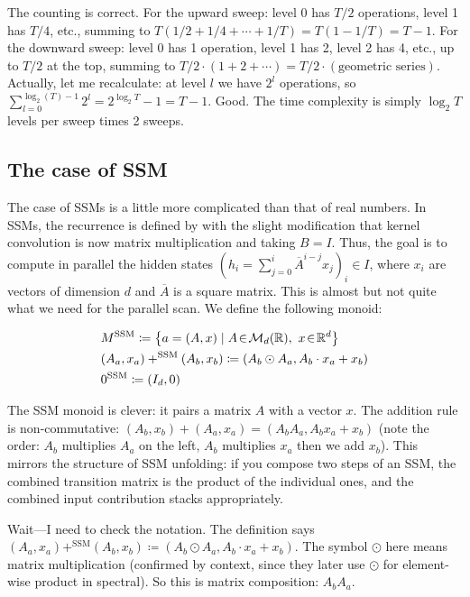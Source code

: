\begin{ThomasAnnotation}
The counting is correct. For the upward sweep: level 0 has $T/2$ operations, level 1 has $T/4$, etc., summing to $T(1/2 + 1/4 + \cdots + 1/T) = T(1 - 1/T) = T-1$. For the downward sweep: level 0 has 1 operation, level 1 has 2, level 2 has 4, etc., up to $T/2$ at the top, summing to $T/2 \cdot (1 + 2 + \cdots) = T/2 \cdot (\text{geometric series})$. Actually, let me recalculate: at level $l$ we have $2^l$ operations, so $\sum_{l=0}^{\log_2(T)-1} 2^l = 2^{\log_2 T} - 1 = T - 1$. Good. The time complexity is simply $\log_2 T$ levels per sweep times 2 sweeps.
\end{ThomasAnnotation}

\subsection{The case of SSM}
\label{sec:scan_SSM}

The case of SSMs is a little more complicated than that of real numbers. In SSMs, the recurrence is defined by  with the slight modification that kernel convolution is now matrix multiplication and taking $B = I$. Thus, the goal is to compute in parallel the hidden states $(h_i = \sum_{j=0}^i\overline{A}^{i-j}x_j)_i\in I$, where $x_i$ are vectors of dimension $d$ and $\overline{A}$ is a square matrix. This is almost but not quite what we need for the parallel scan. We define the following monoid:

\begin{align}
\label{eq:M_SSM}
    &M^{\mathrm{SSM}}\coloneqq \left\{a = (A, x)\mid A\!\in\!\mathcal{M}_{d}(\mathbb{R}),~x\!\in\!\mathbb{R}^d\right\}\\
\label{eq:+_SSM}
    &(A_a, x_a) +^{\mathrm{SSM}} (A_b,x_b)\coloneqq (A_b \odot A_a, A_b \cdot x_a + x_b)\\
\label{eq:0_SSM}
    &0^{\mathrm{SSM}}\coloneqq(I_d, 0)
\end{align}

\begin{ThomasAnnotation}
The SSM monoid is clever: it pairs a matrix $A$ with a vector $x$. The addition rule is non-commutative: $(A_b, x_b) + (A_a, x_a) = (A_b A_a, A_b x_a + x_b)$ (note the order: $A_b$ multiplies $A_a$ on the left, $A_b$ multiplies $x_a$ then we add $x_b$). This mirrors the structure of SSM unfolding: if you compose two steps of an SSM, the combined transition matrix is the product of the individual ones, and the combined input contribution stacks appropriately.

Wait—I need to check the notation. The definition says $(A_a, x_a) +^{\mathrm{SSM}} (A_b, x_b) \coloneqq (A_b \odot A_a, A_b \cdot x_a + x_b)$. The symbol $\odot$ here means matrix multiplication (confirmed by context, since they later use $\odot$ for element-wise product in spectral). So this is matrix composition: $A_b A_a$.
\end{ThomasAnnotation}

